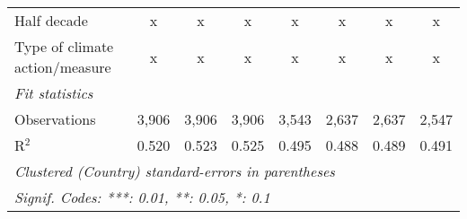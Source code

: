 \begin{tabular}{lccccccc}
   Half decade                                                                        & x              & x              & x              & x              & x             & x             & x\\  
   Type of climate action/measure                                                     & x              & x              & x              & x              & x             & x             & x\\  
   \midrule \emph{Fit statistics}\\
   Observations                                                                       & 3,906          & 3,906          & 3,906          & 3,543          & 2,637         & 2,637         & 2,547\\  
   R$^2$                                                                              & 0.520          & 0.523          & 0.525          & 0.495          & 0.488         & 0.489         & 0.491\\  
   \midrule
   \multicolumn{8}{l}{\emph{Clustered (Country) standard-errors in parentheses}}\\
   \multicolumn{8}{l}{\emph{Signif. Codes: ***: 0.01, **: 0.05, *: 0.1}}\\
\end{tabular}
\par\endgroup


